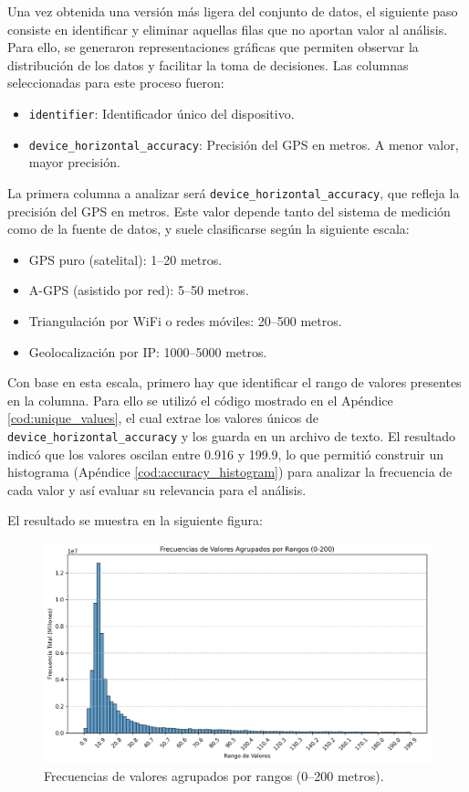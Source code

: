 Una vez obtenida una versión más ligera del conjunto de datos, el siguiente paso consiste en identificar y eliminar aquellas filas que no aportan valor al análisis. Para ello, se generaron representaciones gráficas que permiten observar la distribución de los datos y facilitar la toma de decisiones. Las columnas seleccionadas para este proceso fueron:

\begin{itemize}
    \item \texttt{identifier}: Identificador único del dispositivo.
    \item \texttt{device\_horizontal\_accuracy}: Precisión del GPS en metros. A menor valor, mayor precisión.
\end{itemize}

La primera columna a analizar será \texttt{device\_horizontal\_accuracy}, que refleja la precisión del GPS en metros. Este valor depende tanto del sistema de medición como de la fuente de datos, y suele clasificarse según la siguiente escala:

\begin{itemize}
    \item GPS puro (satelital): 1–20 metros.
    \item A-GPS (asistido por red): 5–50 metros.
    \item Triangulación por WiFi o redes móviles: 20–500 metros.
    \item Geolocalización por IP: 1000–5000 metros.
\end{itemize}

Con base en esta escala,  primero hay que identificar el rango de valores presentes en la columna. Para ello se utilizó el código mostrado en el Apéndice \ref{cod:unique_values}, el cual extrae los valores únicos de \texttt{device\_horizontal\_accuracy} y los guarda en un archivo de texto. El resultado indicó que los valores oscilan entre 0.916 y 199.9, lo que permitió construir un histograma (Apéndice \ref{cod:accuracy_histogram}) para analizar la frecuencia de cada valor y así evaluar su relevancia para el análisis.

El resultado se muestra en la siguiente figura:

\begin{figure}[H]
    \centering
    \includegraphics[width=\textwidth]{img/histograma_frecuencias_accuracy.png}
    \caption{Frecuencias de valores agrupados por rangos (0–200 metros).}
    \label{fig:accuracy_histogram}
\end{figure}

